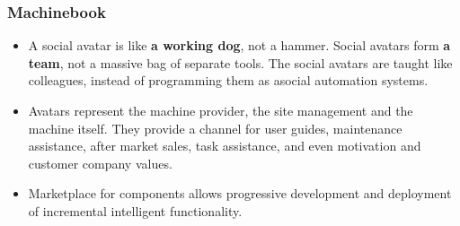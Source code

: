 \documentclass[8pt]{beamer}
\begin{document}
\begin{frame}
\frametitle{Machinebook}
\begin{itemize}
 \item A social avatar is like \textbf{a working dog}, not a hammer. Social avatars form \textbf{a team}, not a massive bag of separate tools.
       The social avatars are taught like colleagues, instead of programming them as asocial automation systems.
 \item Avatars represent the machine provider, the site management and the machine itself. They provide a channel for user guides, maintenance assistance, after market sales,
       task assistance, and even motivation and customer company values.
 \item Marketplace for components allows progressive development and deployment of incremental intelligent functionality.
\end{itemize}

\end{frame}
\end{document}
